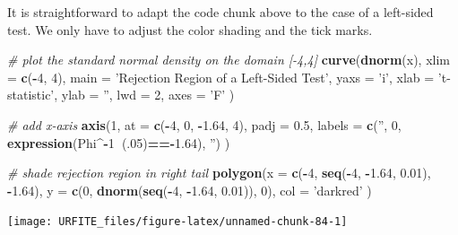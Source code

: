 \documentclass[]{book}
\newenvironment{Shaded}{\begin{snugshade}}{\end{snugshade}}
\newcommand{\KeywordTok}[1]{\textcolor[rgb]{0.13,0.29,0.53}{\textbf{#1}}}
\newcommand{\DataTypeTok}[1]{\textcolor[rgb]{0.13,0.29,0.53}{#1}}
\newcommand{\DecValTok}[1]{\textcolor[rgb]{0.00,0.00,0.81}{#1}}
\newcommand{\FloatTok}[1]{\textcolor[rgb]{0.00,0.00,0.81}{#1}}
\newcommand{\StringTok}[1]{\textcolor[rgb]{0.31,0.60,0.02}{#1}}
\newcommand{\CommentTok}[1]{\textcolor[rgb]{0.56,0.35,0.01}{\textit{#1}}}
\newcommand{\OperatorTok}[1]{\textcolor[rgb]{0.81,0.36,0.00}{\textbf{#1}}}
\newcommand{\NormalTok}[1]{#1}
\theoremstyle{definition}
\theoremstyle{definition}
\theoremstyle{definition}
\theoremstyle{remark}
\begin{document}
It is straightforward to adapt the code chunk above to the case of a
left-sided test. We only have to adjust the color shading and the tick
marks.

\begin{Shaded}
\begin{Highlighting}[]
\CommentTok{# plot the standard normal density on the domain [-4,4]}
\KeywordTok{curve}\NormalTok{(}\KeywordTok{dnorm}\NormalTok{(x),}
      \DataTypeTok{xlim =} \KeywordTok{c}\NormalTok{(}\OperatorTok{-}\DecValTok{4}\NormalTok{, }\DecValTok{4}\NormalTok{),}
      \DataTypeTok{main =} \StringTok{'Rejection Region of a Left-Sided Test'}\NormalTok{,}
      \DataTypeTok{yaxs =} \StringTok{'i'}\NormalTok{,}
      \DataTypeTok{xlab =} \StringTok{'t-statistic'}\NormalTok{,}
      \DataTypeTok{ylab =} \StringTok{''}\NormalTok{,}
      \DataTypeTok{lwd =} \DecValTok{2}\NormalTok{,}
      \DataTypeTok{axes =} \StringTok{'F'}
\NormalTok{)}

\CommentTok{# add x-axis}
\KeywordTok{axis}\NormalTok{(}\DecValTok{1}\NormalTok{, }
     \DataTypeTok{at =} \KeywordTok{c}\NormalTok{(}\OperatorTok{-}\DecValTok{4}\NormalTok{, }\DecValTok{0}\NormalTok{, }\OperatorTok{-}\FloatTok{1.64}\NormalTok{, }\DecValTok{4}\NormalTok{), }
     \DataTypeTok{padj =} \FloatTok{0.5}\NormalTok{,}
     \DataTypeTok{labels =} \KeywordTok{c}\NormalTok{(}\StringTok{''}\NormalTok{, }\DecValTok{0}\NormalTok{, }\KeywordTok{expression}\NormalTok{(Phi}\OperatorTok{^-}\DecValTok{1}\OperatorTok{~}\NormalTok{(.}\DecValTok{05}\NormalTok{)}\OperatorTok{==-}\FloatTok{1.64}\NormalTok{), }\StringTok{''}\NormalTok{)}
\NormalTok{)}

\CommentTok{# shade rejection region in right tail}
\KeywordTok{polygon}\NormalTok{(}\DataTypeTok{x =} \KeywordTok{c}\NormalTok{(}\OperatorTok{-}\DecValTok{4}\NormalTok{, }\KeywordTok{seq}\NormalTok{(}\OperatorTok{-}\DecValTok{4}\NormalTok{, }\OperatorTok{-}\FloatTok{1.64}\NormalTok{, }\FloatTok{0.01}\NormalTok{), }\OperatorTok{-}\FloatTok{1.64}\NormalTok{),}
        \DataTypeTok{y =} \KeywordTok{c}\NormalTok{(}\DecValTok{0}\NormalTok{, }\KeywordTok{dnorm}\NormalTok{(}\KeywordTok{seq}\NormalTok{(}\OperatorTok{-}\DecValTok{4}\NormalTok{, }\OperatorTok{-}\FloatTok{1.64}\NormalTok{, }\FloatTok{0.01}\NormalTok{)), }\DecValTok{0}\NormalTok{), }
        \DataTypeTok{col =} \StringTok{'darkred'}
\NormalTok{)}
\end{Highlighting}
\end{Shaded}

\begin{center}\texttt{[image: URFITE\_files/figure-latex/unnamed-chunk-84-1]} \end{center}
\end{document}
